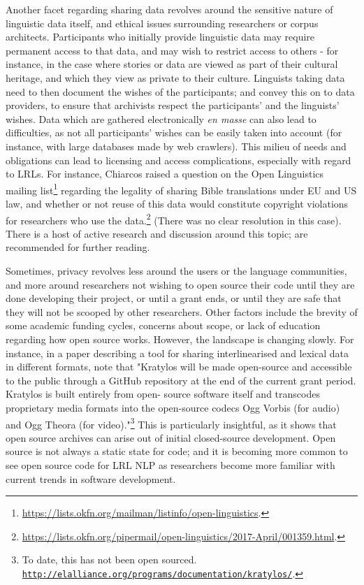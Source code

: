 Another facet regarding sharing data revolves around the sensitive nature of linguistic data itself, and ethical issues surrounding researchers or corpus architects. Participants who initially provide linguistic data may require permanent access to that data, and may wish to restrict access to others - for instance, in the case where stories or data are viewed as part of their cultural heritage, and which they view as private to their culture. Linguists taking data need to then document the wishes of the participants; and convey this on to data providers, to ensure that archivists respect the participants' and the linguists' wishes. Data which are gathered electronically {\it en masse} can  also lead to difficulties, as not all participants' wishes can be easily taken into account (for instance, with large databases made by web crawlers). This milieu of needs and obligations can lead to licensing and access complications, especially with regard to LRLs. For instance, Chiarcos raised a question on the Open Linguistics mailing list\footnote{\href{https://lists.okfn.org/mailman/listinfo/open-linguistics}{https://lists.okfn.org/mailman/listinfo/open-linguistics}. } regarding the legality of sharing Bible translations under EU and US law, and whether or not reuse of this data would constitute copyright violations for researchers who use the data.\footnote{\href{https://lists.okfn.org/pipermail/open-linguistics/2017-April/001359.html}{https://lists.okfn.org/pipermail/open-linguistics/2017-April/001359.html}. } (There was no clear resolution in this case). There is a host of active research and discussion around this topic; \citet{liberman2000legal, newman2007copyright, rice2006ethical, austin2010communities, o2010ethical, cushman2013wampum} are recommended for further reading.

Sometimes, privacy revolves less around the users or the language communities, and more around researchers not wishing to open source their code until they are done developing their project, or until a grant ends, or until they are safe that they will not be scooped by other researchers. Other factors include the brevity of some academic funding cycles, concerns about scope, or lack of education regarding how open source works. However, the landscape is changing slowly. For instance, in a paper describing a tool for sharing interlinearised and lexical data in different formats, \citet[132]{kaufman2018kratylos} note that "Kratylos will be made open-source and accessible to the public through a GitHub repository at the end of the current grant period. Kratylos is built entirely from open- source software itself and transcodes proprietary media formats into the open-source codecs Ogg Vorbis (for audio) and Ogg Theora (for video)."\footnote{To date, this has not been open sourced. \href{http://elalliance.org/programs/documentation/kratylos/}{\nolinkurl{http://elalliance.org/programs/documentation/kratylos/}}. } This is particularly insightful, as it shows that open source archives can arise out of initial closed-source development. Open source is not always a static state for code; and it is becoming more common to see open source code for LRL NLP as researchers become more familiar with current trends in software development.

